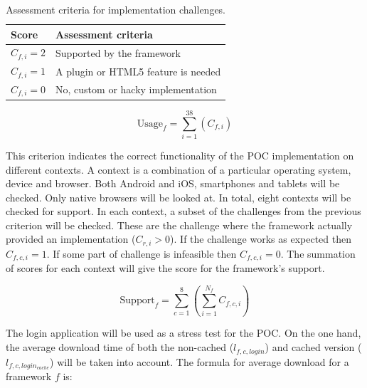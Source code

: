 \documentclass[a4paper]{artikel3}
\newcommand{\setspace}[0]{\vspace{2mm}}
\renewcommand{\paragraph}[1]{\setspace \noindent {\bf #1}  }
\begin{document}
\begin{table}[h]	
\centering
\begin{tabular}{ll}
\toprule
\textbf{Score} & \textbf{Assessment criteria}\\
\midrule
$C_{f,i} = 2$ & Supported by the framework\\
$C_{f,i} = 1$ & A plugin or HTML5 feature is needed\\
$C_{f,i} = 0$ & No, custom or hacky implementation\\
\bottomrule
\end{tabular}
\caption{Assessment criteria for implementation challenges.}
\label{table:challenges-scores}
\end{table}

\begin{equation}
  \text{Usage}_f = \sum_{i=1}^{38}{\left(C_{f,i}\right)}
  \label{eq:gebruik}
\end{equation}

\paragraph{Support}
This criterion indicates the correct functionality of the POC implementation on different contexts.
A context is a combination of a particular operating system, device and browser.
Both Android and iOS, smartphones and tablets will be checked.
Only native browsers will be looked at.
In total, eight contexts will be checked for support.
In each context,  a subset of the challenges from the previous criterion will be checked.  
These are the challenge where the framework actually provided an implementation ($C_{r,i} > 0$).
If the challenge works as expected then $C_{f,c,i} = 1$.
If some part of challenge is infeasible then $C_{f,c,i} = 0$.
The summation of scores for each context will give the score for the framework's support.

\begin{equation}
  \text{Support}_f = \sum_{c=1}^{8}{\left(\sum\limits_{i=1}^{N_f}C_{f,c,i}\right)}
  \label{eq:ondersteuning}
\end{equation}

\paragraph{Performance}
The login application will be used as a stress test for the POC.
On the one hand, the average download time of both the non-cached ($l_{f,c,login}$) and cached version ($l_{f,c,login_{cache}}$) will be taken into account.
The formula for average download for a framework $f$ is:
\end{document}
